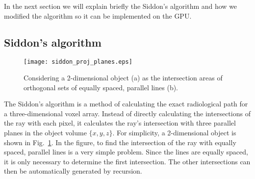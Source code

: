 In the next section we will explain briefly the Siddon's algorithm and how we modified the algorithm so it can be implemented on the GPU. 

\subsection{Siddon's algorithm}
%
\begin{figure}
\centering
\texttt{[image: siddon\_proj\_planes.eps]}
\caption{Considering a 2-dimensional object (a) as the intersection areas of orthogonal sets of equally spaced, parallel lines (b).}
\label{fig:forward_backward_model}
\end{figure}
%
The Siddon's algorithm is a method of calculating the exact radiological path for a three-dimensional voxel array.  Instead of directly calculating the intersections of the ray with each pixel, it calculates the ray's intersection with three parallel planes in the object volume $\{ x, y, z \}$.  For simplicity, a 2-dimensional object is shown in Fig.~\ref{fig:forward_backward_model}.  In the figure, to find the intersection of the ray with equally spaced, parallel lines is a very simple problem.  Since the lines are equally spaced, it is only necessary to determine the first intersection.  The other intersections can then be automatically generated by recursion.  

